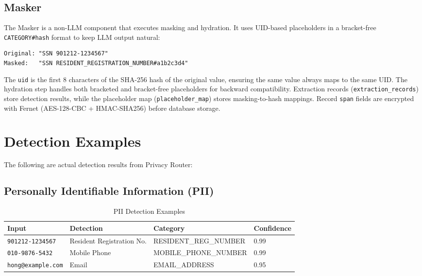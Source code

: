 \documentclass[11pt,a4paper]{article}
\begin{document}
\subsection{Masker}

The Masker is a non-LLM component that executes masking and hydration. It uses UID-based placeholders in a bracket-free \texttt{CATEGORY\#hash} format to keep LLM output natural:

\begin{verbatim}
Original: "SSN 901212-1234567"
Masked:   "SSN RESIDENT_REGISTRATION_NUMBER#a1b2c3d4"
\end{verbatim}

The \texttt{uid} is the first 8 characters of the SHA-256 hash of the original value, ensuring the same value always maps to the same UID. The hydration step handles both bracketed and bracket-free placeholders for backward compatibility. Extraction records (\texttt{extraction\_records}) store detection results, while the placeholder map (\texttt{placeholder\_map}) stores masking-to-hash mappings. Record \texttt{span} fields are encrypted with Fernet (AES-128-CBC + HMAC-SHA256) before database storage.

\section{Detection Examples}

The following are actual detection results from Privacy Router:

\subsection{Personally Identifiable Information (PII)}

\begin{table}[h]
\centering
\begin{tabular}{@{}llll@{}}
\toprule
Input & Detection & Category & Confidence \\
\midrule
\texttt{901212-1234567} & Resident Registration No. & RESIDENT\_REG\_NUMBER & 0.99 \\
\texttt{010-9876-5432} & Mobile Phone & MOBILE\_PHONE\_NUMBER & 0.99 \\
\texttt{hong@example.com} & Email & EMAIL\_ADDRESS & 0.95 \\
\bottomrule
\end{tabular}
\caption{PII Detection Examples}
\end{table}
\end{document}
